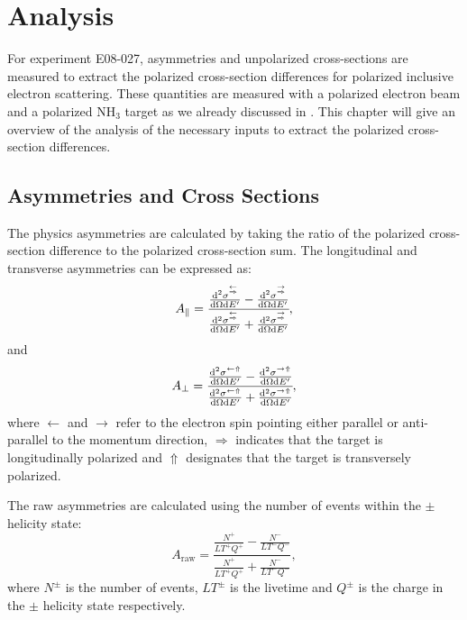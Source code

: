 
\chapter{Analysis}
\label{C7}

For experiment E08-027, asymmetries and unpolarized cross-sections are measured to extract the polarized cross-section differences for polarized inclusive electron scattering. These quantities are measured with a polarized electron beam and a polarized NH${}_3$ target as we already discussed in . This chapter will give an overview of the analysis of the necessary inputs to extract the polarized cross-section differences.

\section{Asymmetries and Cross Sections}
\label{C7S1}

The physics asymmetries are calculated by taking the ratio of the polarized cross-section difference to the polarized cross-section sum. The longitudinal and transverse asymmetries can be expressed as:
\begin{equation} \label{C7S1E1}
A_{\parallel}=\cfrac{\frac{\dd[2]{\sigma}^{\buildrel\leftarrow\over\Rightarrow}}{\dd{\Omega}\dd{E'}}-\frac{\dd[2]{\sigma}^{\buildrel\rightarrow\over\Rightarrow}}{\dd{\Omega}\dd{E'}}}{\frac{\dd[2]{\sigma}^{\buildrel\leftarrow\over\Rightarrow}}{\dd{\Omega}\dd{E'}}+\frac{\dd[2]{\sigma}^{\buildrel\rightarrow\over\Rightarrow}}{\dd{\Omega}\dd{E'}}},
\end{equation}
and
\begin{equation} \label{C7S1E2}
A_{\perp}=\cfrac{\frac{\dd[2]{\sigma}^{\leftarrow\Uparrow}}{\dd{\Omega}\dd{E'}}-\frac{\dd[2]{\sigma}^{\rightarrow\Uparrow}}{\dd{\Omega}\dd{E'}}}{\frac{\dd[2]{\sigma}^{\leftarrow\Uparrow}}{\dd{\Omega}\dd{E'}}+\frac{\dd[2]{\sigma}^{\rightarrow\Uparrow}}{\dd{\Omega}\dd{E'}}},
\end{equation}
where $\leftarrow$ and $\rightarrow$ refer to the electron spin pointing either parallel or anti-parallel to the momentum direction, $\Rightarrow$ indicates that the target is longitudinally polarized and $\Uparrow$ designates that the target is transversely polarized.

The raw asymmetries are calculated using the number of events within the $\pm$ helicity state:
\begin{equation} \label{C7S1E3}
A_{\mathrm{raw}}=\frac{\frac{N^+}{LT^+Q^+}-\frac{N^-}{LT^-Q^-}}{\frac{N^+}{LT^+Q^+}+\frac{N^-}{LT^-Q^-}},
\end{equation}
where $N^\pm$ is the number of events, $LT^{\pm}$ is the livetime and $Q^\pm$ is the charge in the $\pm$ helicity state respectively.

